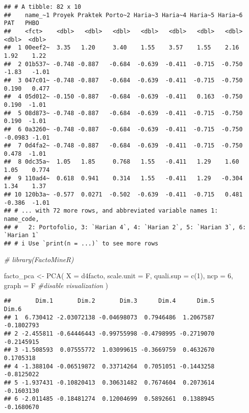 \documentclass[
]{article}
\newenvironment{Shaded}{\begin{snugshade}}{\end{snugshade}}
\newcommand{\AttributeTok}[1]{\textcolor[rgb]{0.77,0.63,0.00}{#1}}
\newcommand{\CommentTok}[1]{\textcolor[rgb]{0.56,0.35,0.01}{\textit{#1}}}
\newcommand{\DecValTok}[1]{\textcolor[rgb]{0.00,0.00,0.81}{#1}}
\newcommand{\FunctionTok}[1]{\textcolor[rgb]{0.00,0.00,0.00}{#1}}
\newcommand{\NormalTok}[1]{#1}
\newcommand{\OtherTok}[1]{\textcolor[rgb]{0.56,0.35,0.01}{#1}}
\newcommand{\SpecialCharTok}[1]{\textcolor[rgb]{0.00,0.00,0.00}{#1}}
\begin{document}
\begin{verbatim}
## # A tibble: 82 x 10
##    name_~1 Proyek Praktek Porto~2 Haria~3 Haria~4 Haria~5 Haria~6     PAT   PHBO
##    <fct>    <dbl>   <dbl>   <dbl>   <dbl>   <dbl>   <dbl>   <dbl>   <dbl>  <dbl>
##  1 00eef2~  3.35   1.20     3.40    1.55    3.57    1.55    2.16   1.92    1.22 
##  2 01b537~ -0.748 -0.887   -0.684  -0.639  -0.411  -0.715  -0.750 -1.83   -1.01 
##  3 047c01~ -0.748 -0.887   -0.684  -0.639  -0.411  -0.715  -0.750  0.190   0.477
##  4 05d012~ -0.150 -0.887   -0.684  -0.639  -0.411   0.163  -0.750  0.190  -1.01 
##  5 08d873~ -0.748 -0.887   -0.684  -0.639  -0.411  -0.715  -0.750  0.190  -1.01 
##  6 0a3260~ -0.748 -0.887   -0.684  -0.639  -0.411  -0.715  -0.750 -0.0983 -1.01 
##  7 0d4fa2~ -0.748 -0.887   -0.684  -0.639  -0.411  -0.715  -0.750  0.478  -1.01 
##  8 0dc35a~  1.05   1.85     0.768   1.55   -0.411   1.29    1.60   1.05    0.774
##  9 110ad4~  0.618  0.941    0.314   1.55   -0.411   1.29   -0.304  1.34    1.37 
## 10 120b3a~ -0.577  0.0271  -0.502  -0.639  -0.411  -0.715   0.481 -0.386  -1.01 
## # ... with 72 more rows, and abbreviated variable names 1: name_code,
## #   2: Portofolio, 3: `Harian 4`, 4: `Harian 2`, 5: `Harian 3`, 6: `Harian 1`
## # i Use `print(n = ...)` to see more rows
\end{verbatim}

\begin{Shaded}
\begin{Highlighting}[]
\CommentTok{\# library(FactoMineR)}

\NormalTok{facto\_pca }\OtherTok{\textless{}{-}} \FunctionTok{PCA}\NormalTok{(}
  \AttributeTok{X =}\NormalTok{ d4facto,}
  \AttributeTok{scale.unit =}\NormalTok{ F, }
  \AttributeTok{quali.sup =} \FunctionTok{c}\NormalTok{(}\DecValTok{1}\NormalTok{), }
  \AttributeTok{ncp =} \DecValTok{6}\NormalTok{, }
  \AttributeTok{graph =}\NormalTok{ F }\CommentTok{\#disable visualization}
\NormalTok{  )}
\end{Highlighting}
\end{Shaded}

\begin{Shaded}
\end{Shaded}

\begin{verbatim}
##       Dim.1       Dim.2       Dim.3      Dim.4      Dim.5      Dim.6
## 1  6.730412 -2.03072138 -0.04698073  0.7946486  1.2067587 -0.1802793
## 2 -2.455811 -0.64446443 -0.99755998 -0.4798995 -0.2719070 -0.2145915
## 3 -1.508593  0.07555772  1.03099615 -0.3669759  0.4632670  0.1705318
## 4 -1.388104 -0.06519872  0.33714264  0.7051051 -0.1443258 -0.8125022
## 5 -1.937431 -0.10820413  0.30631482  0.7674604  0.2073614 -0.1603130
## 6 -2.011485 -0.18481274  0.12004699  0.5892661  0.1388945 -0.1680670
\end{verbatim}
\end{document}

